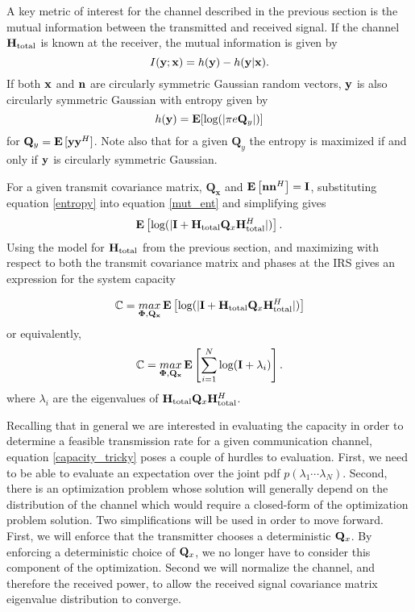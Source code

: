 A key metric of interest for the channel described in the previous section is the mutual information between the transmitted and received signal. If the channel $\mathbf{H}_\text{total}$ is known at the receiver, the mutual information is given by 
\begin{equation}\label{mut_ent}
I(\mathbf{y};\mathbf{x}) = h(\mathbf{y}) - h(\mathbf{y}|\mathbf{x}).
\end{equation}
If both $\mathbf{x}$ and $\mathbf{n}$ are circularly symmetric Gaussian random vectors, $\mathbf{y}$ is also circularly symmetric Gaussian with entropy given by \cite{telatar1999capacity} 
\begin{equation}\label{entropy}
h(\mathbf{y}) = \mathop{\bf E{}}[\text{log{}}(|\pi e \mathbf{Q}_{y}|)]
\end{equation}
 for $\mathbf{Q}_{y} = \mathop{\bf E{}}{[\mathbf{y} \mathbf{y}^H]}$. Note also that for a given $\mathbf{Q}_{y}$ the entropy is maximized if and only if $\mathbf{y}$ is circularly symmetric Gaussian.

For a given transmit covariance matrix, $\mathbf{Q_x}$ and $\mathop{\bf E{}}\left[\mathbf{n}\mathbf{n}^H \right] = \mathbf{I}$, substituting equation \eqref{entropy} into equation
\eqref{mut_ent} and simplifying gives
\begin{equation}\label{mut_inf}
\mathop{\bf E{}} \left[\text{log{}}(|\mathbf{I} + \mathbf{H}_\text{total} \mathbf{Q}_x \mathbf{H}_\text{total}^H|)\right].
\end{equation}
Using the model for $\mathbf{H}_\text{total}$ from the previous section, and maximizing with respect to both the
transmit covariance matrix and phases at the IRS gives an expression for the system capacity

\begin{equation}\label{capacity}
\mathbb{C} = \underset{\boldsymbol{\Phi},\mathbf{Q_x}}{\mathop{max}} \mathop{\bf E{}} \left[\text{log{}}(|\mathbf{I} + \mathbf{H}_\text{total} \mathbf{Q}_x \mathbf{H}_\text{total}^H|)\right]
\end{equation}
or equivalently,
\begin{equation}\label{capacity_tricky}
\mathbb{C} = \underset{\boldsymbol{\Phi},\mathbf{Q_x}}{\mathop{max}} \mathop{\bf E{}} \left[\sum_{i=1}^{N}\text{log{}}(\mathbf{I} + \lambda_i)\right].
\end{equation}
where $\lambda_i$ are the eigenvalues of $\mathbf{H}_\text{total} \mathbf{Q}_x \mathbf{H}_\text{total}^H$.

Recalling that in general we are interested in evaluating the capacity in order to determine a feasible transmission rate for a given communication channel, equation \eqref{capacity_tricky} poses a couple of hurdles to evaluation. First, we need to be able to evaluate an expectation over the joint pdf $p(\lambda_1 \cdots	 \lambda_N)$. Second, there is an optimization problem whose solution will generally depend on the distribution of the channel which would require a closed-form of the optimization problem solution. 
Two simplifications will be used in order to move forward. 
First, we will enforce that the transmitter chooses a deterministic $\mathbf{Q}_x$. 
By enforcing a deterministic choice of $\mathbf{Q}_x$, we no longer have to consider this component of the optimization.
Second we will normalize the channel, and therefore the received power, to allow the received signal covariance matrix eigenvalue distribution to converge. 



